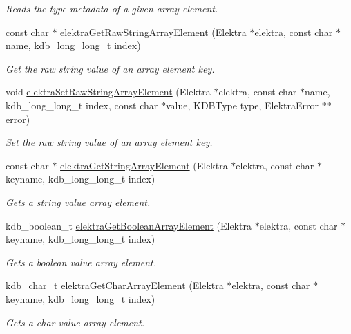 \begin{DoxyCompactItemize}
\begin{DoxyCompactList}\small\item\em Reads the type metadata of a given array element. \end{DoxyCompactList}\item 
const char $\ast$ \hyperlink{group__highlevel_ga1b704f49a8e87262b670cd191ba61bb3}{elektra\+Get\+Raw\+String\+Array\+Element} (Elektra $\ast$elektra, const char $\ast$name, kdb\+\_\+long\+\_\+long\+\_\+t index)
\begin{DoxyCompactList}\small\item\em Get the raw string value of an array element key. \end{DoxyCompactList}\item 
void \hyperlink{group__highlevel_ga965e0b2ce7d5e8938965259c3f584600}{elektra\+Set\+Raw\+String\+Array\+Element} (Elektra $\ast$elektra, const char $\ast$name, kdb\+\_\+long\+\_\+long\+\_\+t index, const char $\ast$value, K\+D\+B\+Type type, Elektra\+Error $\ast$$\ast$error)
\begin{DoxyCompactList}\small\item\em Set the raw string value of an array element key. \end{DoxyCompactList}\item 
const char $\ast$ \hyperlink{group__highlevel_gaf445216facccfc7ad6740b594e7a8f6e}{elektra\+Get\+String\+Array\+Element} (Elektra $\ast$elektra, const char $\ast$keyname, kdb\+\_\+long\+\_\+long\+\_\+t index)
\begin{DoxyCompactList}\small\item\em Gets a string value array element. \end{DoxyCompactList}\item 
kdb\+\_\+boolean\+\_\+t \hyperlink{group__highlevel_ga3b9f1f569c63be91d4211bafd0aae249}{elektra\+Get\+Boolean\+Array\+Element} (Elektra $\ast$elektra, const char $\ast$keyname, kdb\+\_\+long\+\_\+long\+\_\+t index)
\begin{DoxyCompactList}\small\item\em Gets a boolean value array element. \end{DoxyCompactList}\item 
kdb\+\_\+char\+\_\+t \hyperlink{group__highlevel_gacb11d0dbaaa6acbd6c16004a97ccd721}{elektra\+Get\+Char\+Array\+Element} (Elektra $\ast$elektra, const char $\ast$keyname, kdb\+\_\+long\+\_\+long\+\_\+t index)
\begin{DoxyCompactList}\small\item\em Gets a char value array element. \end{DoxyCompactList}\item 
$$
\end{DoxyCompactItemize}
